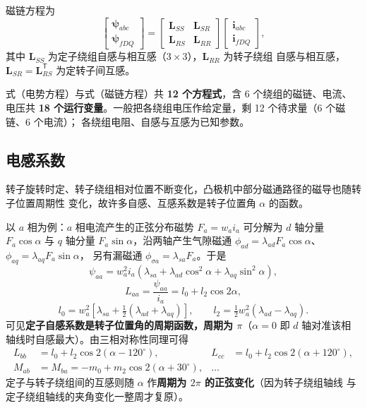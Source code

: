磁链方程为
\begin{equation}
  \begin{bmatrix}\boldsymbol\psi_{abc}\\ \boldsymbol\psi_{fDQ}\end{bmatrix}
  =\begin{bmatrix}\boldsymbol L_{SS} & \boldsymbol L_{SR}\\
          \boldsymbol L_{RS} & \boldsymbol L_{RR}\end{bmatrix}
  \begin{bmatrix}\boldsymbol i_{abc}\\ \boldsymbol i_{fDQ}\end{bmatrix},
\end{equation}
其中 $\boldsymbol L_{SS}$ 为定子绕组自感与相互感（$3\times3$），$\boldsymbol L_{RR}$ 为转子绕组
自感与相互感，$\boldsymbol L_{SR}=\boldsymbol L_{RS}^{\mathsf T}$ 为定转子间互感。

式（电势方程）与式（磁链方程）共 \textbf{12 个方程式}，含 6 个绕组的磁链、电流、电压共
\textbf{18 个运行变量}。一般把各绕组电压作给定量，剩 12 个待求量（6 个磁链、6 个电流）；
各绕组电阻、自感与互感为已知参数。

\subsection{电感系数}

转子旋转时定、转子绕组相对位置不断变化，凸极机中部分磁通路径的磁导也随转子位置周期性
变化，故许多自感、互感系数是转子位置角 $\alpha$ 的函数。

以 $a$ 相为例：$a$ 相电流产生的正弦分布磁势 $F_a=w_a i_a$ 可分解为 $d$ 轴分量
$F_a\cos\alpha$ 与 $q$ 轴分量 $F_a\sin\alpha$，沿两轴产生气隙磁通
$\phi_{ad}=\lambda_{ad}F_a\cos\alpha$、$\phi_{aq}=\lambda_{aq}F_a\sin\alpha$，
另有漏磁通 $\phi_{\sigma a}=\lambda_{sa}F_a$。于是
\begin{equation}
  \psi_{aa}=w_a^2 i_a\left(\lambda_{sa}+\lambda_{ad}\cos^{2}\alpha+\lambda_{aq}\sin^{2}\alpha\right),
\end{equation}
\begin{equation}
  L_{aa}=\frac{\psi_{aa}}{i_a}=l_0+l_2\cos 2\alpha,
\end{equation}
\begin{equation}
  l_0=w_a^2\left[\lambda_{sa}+\tfrac{1}{2}\left(\lambda_{ad}+\lambda_{aq}\right)\right],
  \qquad
  l_2=\tfrac{1}{2}w_a^2\left(\lambda_{ad}-\lambda_{aq}\right).
\end{equation}
可见\textbf{定子自感系数是转子位置角的周期函数，周期为 $\pi$}（$\alpha=0$ 即 $d$ 轴对准该相
轴线时自感最大）。由三相对称性同理可得
\begin{align}
  L_{bb}&=l_0+l_2\cos 2(\alpha-120^\circ),&
  L_{cc}&=l_0+l_2\cos 2(\alpha+120^\circ),\\
  M_{ab}&=M_{ba}=-m_0+m_2\cos 2(\alpha+30^\circ),&\dots
\end{align}
定子与转子绕组间的互感则随 $\alpha$ 作\textbf{周期为 $2\pi$ 的正弦变化}（因为转子绕组轴线
与定子绕组轴线的夹角变化一整周才复原）。

